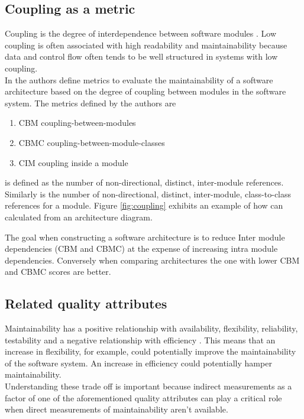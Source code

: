 \documentclass[15pt]{article}
\begin{document}
\subsection{Coupling as a metric}

Coupling is the degree of interdependence between software modules \cite{iso_international_2006}. Low coupling is often associated with high readability and maintainability because data and control flow often tends to be well structured in systems with low coupling.\\

In \cite{lindvall_empirically-based_2003} the authors define metrics to evaluate the maintainability of a software architecture based on the degree of coupling between modules in the software system. The metrics defined by the authors are
\begin{enumerate}
\item CBM coupling-between-modules
\item CBMC coupling-between-module-classes
\item CIM coupling inside a module
\end{enumerate}

 is defined as the number of non-directional, distinct, inter-module references. Similarly  is the number of non-directional, distinct, inter-module, class-to-class references for a module. Figure \ref{fig:coupling} exhibits an example of how  can calculated from an architecture diagram.

The goal when constructing a software architecture is to reduce Inter module dependencies (CBM and CBMC) at the expense of increasing intra module dependencies. Conversely when comparing architectures the one with lower CBM and CBMC scores are better.


\subsection{Related quality attributes}
Maintainability has a positive relationship with availability, flexibility, reliability, testability and a negative relationship with efficiency \cite{karl_software_2003}. This means that an increase in flexibility, for example, could potentially improve the maintainability of the software system. An increase in efficiency could potentially hamper maintainability.\\

Understanding these trade off is important because indirect measurements as a factor of one of the aforementioned quality attributes can play a critical role when direct measurements of maintainability aren't available.
\end{document}
